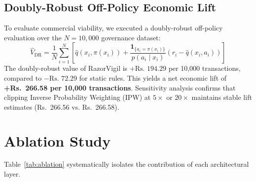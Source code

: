 \documentclass[conference]{IEEEtran}
\begin{document}
\subsection{Doubly-Robust Off-Policy Economic Lift}
To evaluate commercial viability, we executed a doubly-robust off-policy evaluation over the $N=10{,}000$ governance dataset:
\begin{equation}
    \hat{V}_{\text{DR}} = \frac{1}{N} \sum_{i=1}^{N} \left[ \hat{q}(x_i, \pi(x_i)) + \frac{\mathbf{1}_{\{a_i = \pi(x_i)\}}}{p(a_i \mid x_i)} (r_i - \hat{q}(x_i, a_i)) \right]
\end{equation}
The doubly-robust value of RazorVigil is $+\text{Rs.~}194.29$ per 10,000 transactions, compared to $-\text{Rs.~}72.29$ for static rules. This yields a net economic lift of \textbf{+Rs.~266.58 per 10,000 transactions}. Sensitivity analysis confirms that clipping Inverse Probability Weighting (IPW) at $5\times$ or $20\times$ maintains stable lift estimates (Rs.~266.56 vs. Rs.~266.58).

\section{Ablation Study}
\label{sec:ablation}

Table~\ref{tab:ablation} systematically isolates the contribution of each architectural layer.

\begin{table}[h]
\caption{Systematic Component Ablation Analysis}
\setlength{\tabcolsep}{3pt}
\footnotesize
\label{tab:ablation}
\centering\small
{}
\end{table}
\end{document}
